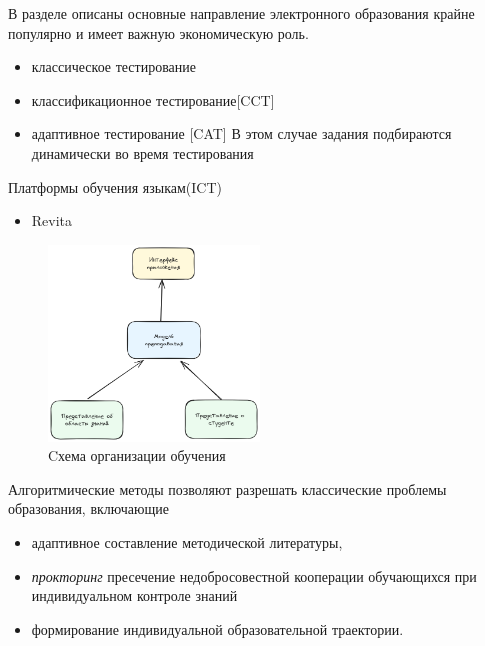 
В разделе описаны основные направление электронного образования 
крайне популярно и имеет важную экономическую роль.


\begin{itemize}
    \item классическое тестирование
    \item классификационное тестирование[CCT] 
    \item адаптивное тестирование [CAT]
    В этом случае задания подбираются динамически во время тестирования
\end{itemize}







Платформы обучения языкам(ICT) \begin{itemize}
    \item Revita \cite{katinskaia2018revita}
\end{itemize}


\begin{figure}[h]
    \centering
    \includegraphics[width=0.5\textwidth]{assets/pedagogic/social/its.excalidraw.png}
    \caption{Cхема организации обучения}
    \label{bkt}
\end{figure}


Алгоритмические методы позволяют разрешать классические проблемы образования, включающие \begin{itemize}
    \item адаптивное составление методической литературы,
    \item \textit{прокторинг} пресечение недобросовестной кооперации обучающихся при  индивидуальном контроле знаний 
    \item формирование индивидуальной образовательной траектории.
\end{itemize}

